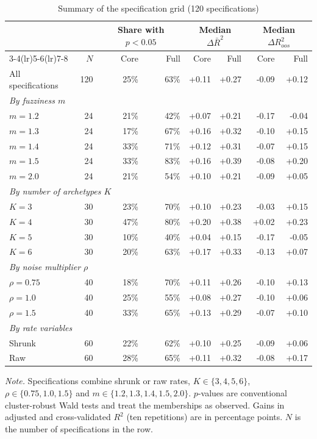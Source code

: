 \begin{table}[ht]
	\centering
	\small
	\caption{Summary of the specification grid (120 specifications)}
	\label{tab:grid}
	\begin{tabular}{lrrrrrrr}
		\toprule
		 & & \multicolumn{2}{c}{Share with $p<0.05$} & \multicolumn{2}{c}{Median $\Delta\bar R^2$} & \multicolumn{2}{c}{Median $\Delta R^2_{oos}$} \\
		\cmidrule(lr){3-4}\cmidrule(lr){5-6}\cmidrule(lr){7-8}
		 & $N$ & Core & Full & Core & Full & Core & Full \\
		\midrule
		All specifications & 120 & 25\% & 63\% & +0.11 & +0.27 & -0.09 & +0.12 \\
		\midrule
		\multicolumn{8}{l}{\emph{By fuzziness $m$}} \\
		\quad $m=1.2$ & 24 & 21\% & 42\% & +0.07 & +0.21 & -0.17 & -0.04 \\
		\quad $m=1.3$ & 24 & 17\% & 67\% & +0.16 & +0.32 & -0.10 & +0.15 \\
		\quad $m=1.4$ & 24 & 33\% & 71\% & +0.12 & +0.31 & -0.07 & +0.15 \\
		\quad $m=1.5$ & 24 & 33\% & 83\% & +0.16 & +0.39 & -0.08 & +0.20 \\
		\quad $m=2.0$ & 24 & 21\% & 54\% & +0.10 & +0.21 & -0.09 & +0.05 \\
		\midrule
		\multicolumn{8}{l}{\emph{By number of archetypes $K$}} \\
		\quad $K=3$ & 30 & 23\% & 70\% & +0.10 & +0.23 & -0.03 & +0.15 \\
		\quad $K=4$ & 30 & 47\% & 80\% & +0.20 & +0.38 & +0.02 & +0.23 \\
		\quad $K=5$ & 30 & 10\% & 40\% & +0.04 & +0.15 & -0.17 & -0.05 \\
		\quad $K=6$ & 30 & 20\% & 63\% & +0.17 & +0.33 & -0.13 & +0.07 \\
		\midrule
		\multicolumn{8}{l}{\emph{By noise multiplier $\rho$}} \\
		\quad $\rho=0.75$ & 40 & 18\% & 70\% & +0.11 & +0.26 & -0.10 & +0.13 \\
		\quad $\rho=1.0$ & 40 & 25\% & 55\% & +0.08 & +0.27 & -0.10 & +0.06 \\
		\quad $\rho=1.5$ & 40 & 33\% & 65\% & +0.13 & +0.29 & -0.07 & +0.10 \\
		\midrule
		\multicolumn{8}{l}{\emph{By rate variables}} \\
		\quad Shrunk & 60 & 22\% & 62\% & +0.10 & +0.25 & -0.09 & +0.06 \\
		\quad Raw & 60 & 28\% & 65\% & +0.11 & +0.32 & -0.08 & +0.17 \\
		\bottomrule
	\end{tabular}
	\par\smallskip
	\parbox{0.95\textwidth}{\footnotesize\emph{Note.} Specifications combine shrunk or raw rates, $K\in\{3,4,5,6\}$, $\rho\in\{0.75,1.0,1.5\}$ and $m\in\{1.2,1.3,1.4,1.5,2.0\}$. $p$-values are conventional cluster-robust Wald tests and treat the memberships as observed. Gains in adjusted and cross-validated $R^2$ (ten repetitions) are in percentage points. $N$ is the number of specifications in the row.}
\end{table}


